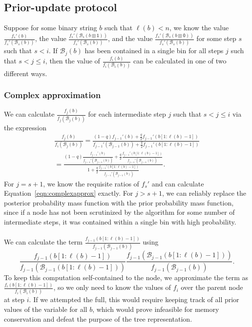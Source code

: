 \documentclass{IEEEtran}
\begin{document}
\subsection{Prior-update protocol}
\label{ssec:treeprior}
Suppose for some binary string
$b$ such that $\ell(b) < n$, we know
the value $\frac{f_s'(b)}{f_s'(\mathcal{B}_s(b))}$, the value
$\frac{f_s'(\mathcal{B}_s(b\boxplus \mathsf{1}))}{f_s'(\mathcal{B}_s(b))}$,
and the value
$\frac{f_s'(\mathcal{B}_s(b\boxplus \mathsf{0}))}{f_s'(\mathcal{B}_s(b))}$
for some step $s$ such that $s < i$. If $\mathcal{B}_j(b)$
has been contained in a single bin for all steps $j$ such that
$s< j \leq i$, then the value of $\frac{f_i(b)}{f_i(\mathcal{B}_i(b))}$
can be calculated in one of two different ways.
\subsubsection{Complex approximation}
We can calculate $\frac{f_j(b)}{f_j(\mathcal{B}_j(b))}$ for
	each intermediate step $j$ such that $s<j\leq i$ via
	the expression
\begin{multline}
\frac{f_j(b)}{f_i(\mathcal{B}_j(b))} = \frac{(1-q)f_{j-1}'(b)+\frac{q}{2}
f_{j-1}'(b[1:\ell(b)-1])}{f_{j-1}'(\mathcal{B}_{j-1}(b))
+\frac{q}{2}f_{j-1}'(b[1:\ell(b)-1])}\\
=\frac{(1-q)\frac{f_{j-1}'(b)}{f_{j-1}'(\mathcal{B}_{j-1}(b))}+
\frac{q}{2}\frac{f_{j-1}'(b[1:\ell(b)-1])}{f_{j-1}'(\mathcal{B}_{j-1}(b))}}
{1+\frac{q}{2}\frac{f_{j-1}'(b[1:\ell(b)-1])}{f_{j-1}'(\mathcal{B}_{j-1}(b))}}.
\label{eqn:complexapprox}
\end{multline}
For $j = s+1$, we know the requisite ratios of $f_s'$ and can calculate
Equation~\ref{eqn:complexapprox} exactly.
For $j > s+1$, we can reliably replace the posterior probability
mass function with the prior probability mass function, since if a node
has not been scrutinized by the algorithm for some number of intermediate
steps, it was contained within a single bin with high probability.
\\ \\
We can calculate the term
$\frac{f_{j-1}(b[1:\ell(b)-1])}{f_{j-1}(\mathcal{B}_{j-1}(b))}$ using
\begin{equation}
\frac{f_{j-1}(b[1:\ell(b)-1])}{f_{j-1}(\mathcal{B}_{j-1}(b[1:\ell(b)-1]))}
\frac{f_{j-1}(\mathcal{B}_{j-1}(b[1:\ell(b)-1]))}
{f_{j-1}(\mathcal{B}_{j-1}(b))}.
\end{equation}
To keep this computation self-contained to the node, we approximate
the term as $\frac{f_i(b[1:\ell(b)-1])}{f_i(\mathcal{B}_i(b))}$, so we
only need to know the values of $f_i$ over the parent node at step $i$. If
we attempted the full, this would require keeping track of all
prior values of the variable for all $b$, which would prove infeasible for
memory conservation and defeat the purpose of the tree representation.
\end{document}
